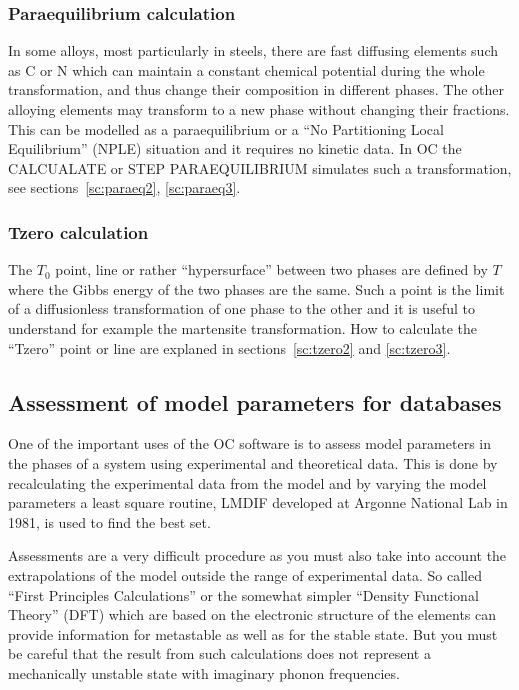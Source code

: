 \documentclass[11pt]{article}
\begin{document}
\subsubsection{Paraequilibrium calculation}\label{sc:paraeq1}

In some alloys, most particularly in steels, there are fast diffusing
elements such as C or N which can maintain a constant chemical
potential during the whole transformation, and thus change their
composition in different phases.  The other alloying elements may
transform to a new phase without changing their fractions.  This can
be modelled as a paraequilibrium or a ``No Partitioning Local
Equilibrium'' (NPLE) situation and it requires no kinetic data.  In OC
the CALCUALATE or STEP PARAEQUILIBRIUM simulates such a
transformation, see sections~\ref{sc:paraeq2}, \ref{sc:paraeq3}.

\subsubsection{Tzero calculation}\label{sc:tzero1}

The $T_0$ point, line or rather ``hypersurface'' between two phases
are defined by $T$ where the Gibbs energy of the two phases are the
same.  Such a point is the limit of a diffusionless transformation of
one phase to the other and it is useful to understand for example the
martensite transformation.  How to calculate the ``Tzero'' point or
line are explaned in sections~\ref{sc:tzero2} and \ref{sc:tzero3}.

\subsection{Assessment of model parameters for databases}

One of the important uses of the OC software is to assess model
parameters in the phases of a system using experimental and
theoretical data.  This is done by recalculating the experimental data
from the model and by varying the model parameters a least square
routine, LMDIF developed at Argonne National Lab in 1981, is used to
find the best set.

Assessments are a very difficult procedure as you must also take into
account the extrapolations of the model outside the range of
experimental data.  So called ``First Principles Calculations'' or the
somewhat simpler ``Density Functional Theory'' (DFT) which are based
on the electronic structure of the elements can provide information
for metastable as well as for the stable state.  But you must be
careful that the result from such calculations does not represent a
mechanically unstable state with imaginary phonon frequencies.
\end{document}
